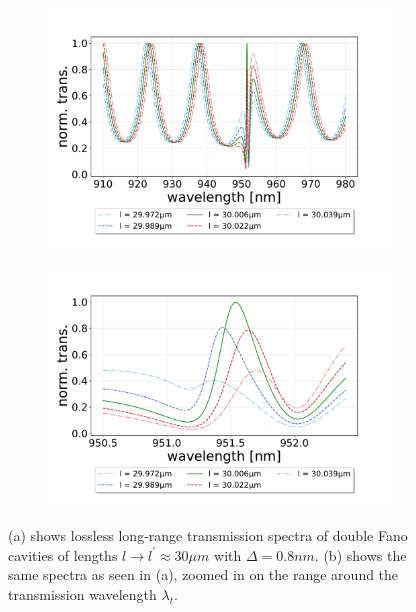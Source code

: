 \begin{figure}[h!]
    \centering
    \begin{subfigure}[b]{0.49\textwidth}
        \includegraphics[width=\textwidth]{figures/large_detuning_length_scan_long.pdf}
        \caption{}
        \label{fig:detuned_large_length_scan_long}
    \end{subfigure}
    \begin{subfigure}[b]{0.49\textwidth}
        \includegraphics[width=\textwidth]{figures/large_detuning_length_scan_short.pdf}
        \caption{}
        \label{fig:detuned_large_length_scan_short}
    \end{subfigure}
    \caption{(a) shows lossless long-range transmission spectra of double Fano cavities of lengths $l \rightarrow l^{\prime} \approx 30 \mu m$ with $\Delta = 0.8nm$. (b) shows the same spectra as seen in (a), zoomed in on the range around the transmission wavelength $\lambda_t$.}
    \label{fig:large_detuning_length_scans}
\end{figure}

